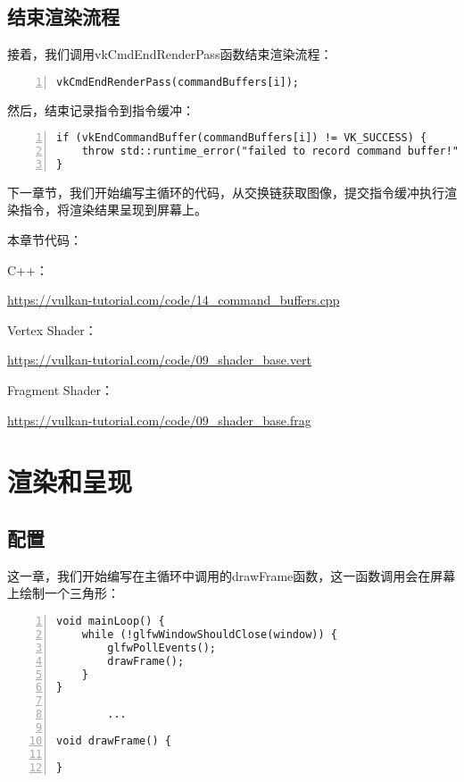 \documentclass{ctexart}
\begin{document}
\subsection{结束渲染流程}

接着，我们调用vkCmdEndRenderPass函数结束渲染流程：

\begin{lstlisting}[language={[ANSI]C},keywordstyle=\color{blue!70},commentstyle=\color{red!50!green!50!blue!50},frame=shadowbox, rulesepcolor=\color{red!20!green!20!blue!20},basicstyle=\small,numbers=left, numberstyle=\tiny,breaklines=true]
vkCmdEndRenderPass(commandBuffers[i]);
\end{lstlisting}

然后，结束记录指令到指令缓冲：

\begin{lstlisting}[language={[ANSI]C},keywordstyle=\color{blue!70},commentstyle=\color{red!50!green!50!blue!50},frame=shadowbox, rulesepcolor=\color{red!20!green!20!blue!20},basicstyle=\small,numbers=left, numberstyle=\tiny,breaklines=true]
if (vkEndCommandBuffer(commandBuffers[i]) != VK_SUCCESS) {
	throw std::runtime_error("failed to record command buffer!");
}
\end{lstlisting}

下一章节，我们开始编写主循环的代码，从交换链获取图像，提交指令缓冲执行渲染指令，将渲染结果呈现到屏幕上。

本章节代码：

C++：

\url{https://vulkan-tutorial.com/code/14_command_buffers.cpp}

Vertex Shader：

\url{https://vulkan-tutorial.com/code/09_shader_base.vert}

Fragment Shader：

\url{https://vulkan-tutorial.com/code/09_shader_base.frag}

\newpage
\section{渲染和呈现}

\subsection{配置}

这一章，我们开始编写在主循环中调用的drawFrame函数，这一函数调用会在屏幕上绘制一个三角形：

\begin{lstlisting}[language={[ANSI]C},keywordstyle=\color{blue!70},commentstyle=\color{red!50!green!50!blue!50},frame=shadowbox, rulesepcolor=\color{red!20!green!20!blue!20},basicstyle=\small,numbers=left, numberstyle=\tiny,breaklines=true]
void mainLoop() {
	while (!glfwWindowShouldClose(window)) {
		glfwPollEvents();
		drawFrame();
	}
}

		...

void drawFrame() {

}
\end{lstlisting}
\end{document}

